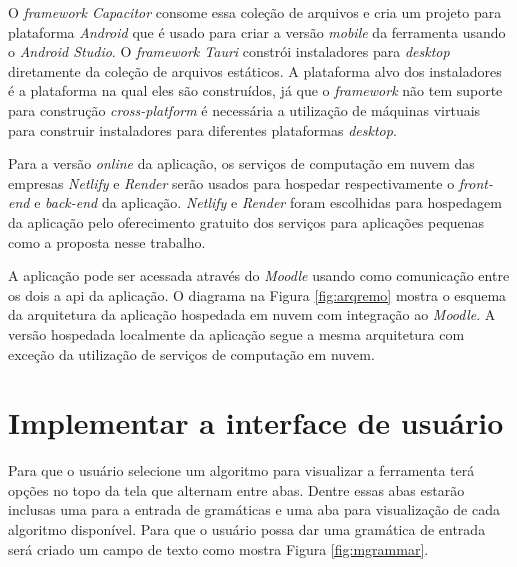 O \textit{framework Capacitor} consome essa coleção de arquivos e cria um projeto para plataforma \textit{Android} que é usado para criar a versão \textit{mobile} da ferramenta usando o \textit{Android Studio}. O \textit{framework Tauri} constrói instaladores para \textit{desktop} diretamente da coleção de arquivos estáticos. A plataforma alvo dos instaladores é a plataforma na qual eles são construídos, já que o \textit{framework} não tem suporte para construção \textit{cross-platform} é necessária a utilização de máquinas virtuais para construir instaladores para diferentes plataformas \textit{desktop}.

Para a versão \textit{online} da aplicação, os serviços de computação em nuvem das empresas \textit{Netlify} e \textit{Render} serão usados para hospedar respectivamente o \textit{front-end} e \textit{back-end} da aplicação. \textit{Netlify} e \textit{Render} foram escolhidas para hospedagem da aplicação pelo oferecimento gratuito dos serviços para aplicações pequenas como a proposta nesse trabalho.

A aplicação pode ser acessada através do \textit{Moodle} usando como comunicação entre os dois a \gls{api} da aplicação. O diagrama na Figura \ref{fig:arqremo} mostra o esquema da arquitetura da aplicação hospedada em nuvem com integração ao \textit{Moodle}. A versão hospedada localmente da aplicação segue a mesma arquitetura com exceção da utilização de serviços de computação em nuvem.



\section{Implementar a interface de usuário}
Para que o usuário selecione um algoritmo para visualizar a ferramenta terá opções no topo da tela que alternam entre abas. Dentre essas abas estarão inclusas uma para a entrada de gramáticas e uma aba para visualização de cada algoritmo disponível. Para que o usuário possa dar uma gramática de entrada será criado um campo de texto como mostra Figura \ref{fig:mgrammar}.

